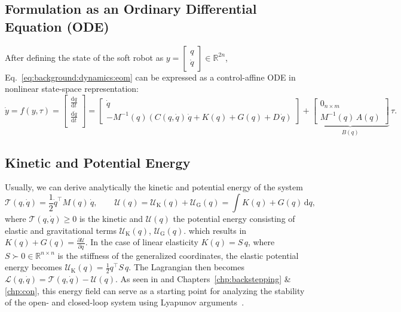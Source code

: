 \subsection{Formulation as an Ordinary Differential Equation (ODE)}
After defining the state of the soft robot as $y = \begin{bmatrix}
    q\\ \dot{q}
\end{bmatrix} \in \mathbb{R}^{2n}$, Eq.~\ref{eq:background:dynamics:eom} can be expressed as a control-affine \gls{ODE} in nonlinear state-space representation:
\begin{equation}
    \dot{y} = f(y,\tau) = \begin{bmatrix}
        \frac{\mathrm{d} q}{\mathrm{d}t}\\
        \frac{\mathrm{d} \dot{q}}{\mathrm{d}t}\\
    \end{bmatrix} = \begin{bmatrix}
        \dot{q}\\
        -M^{-1}(q) \left ( C(q,\dot{q}) \, \dot{q} + K(q) + G(q) + D \, \dot{q} \right )
    \end{bmatrix} + \underbrace{\begin{bmatrix}
        0_{n \times m}\\ M^{-1}(q) \, A(q)
    \end{bmatrix}}_{B(q)} \, \tau.
\end{equation}

\subsection{Kinetic and Potential Energy}
Usually, we can derive analytically the kinetic and potential energy of the system
\begin{equation}
    \mathcal{T}(q,\dot{q}) = \frac{1}{2} \dot{q}^\top M(q) \, \dot{q},
    \qquad
    \mathcal{U}(q) = \mathcal{U}_\mathrm{K}(q) + \mathcal{U}_\mathrm{G}(q) = \int K(q) + G(q) \, \mathrm{d}q,
\end{equation}
where $\mathcal{T}(q,\dot{q}) \geq 0$ is the kinetic and $\mathcal{U}(q)$ the potential energy consisting of elastic and gravitational terms $\mathcal{U}_\mathrm{K}(q)$, $\mathcal{U}_\mathrm{G}(q)$.
which results in $K(q) + G(q) = \frac{\partial \mathcal{U}}{\partial q}$. 
In the case of linear elasticity $K(q) = S \, q$, where $S \succ 0 \in \mathbb{R}^{n \times n}$ is the stiffness of the generalized coordinates, the elastic potential energy becomes $\mathcal{U}_\mathrm{K}(q) = \frac{1}{2} q^\top S \, q$.
The Lagrangian then becomes $\mathcal{L}(q,\dot{q}) = \mathcal{T}(q,\dot{q}) - \mathcal{U}(q)$.
% 
As seen in \citet{della2020model, della2023model} and Chapters~\ref{chp:backstepping} \& \ref{chp:con}, this energy field can serve as a starting point for analyzing the stability of the open- and closed-loop system using Lyapunov arguments~\citep{khalil2002nonlinear}.


